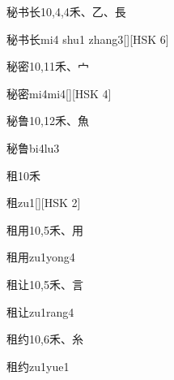 \begin{Entry}{秘书长}{10,4,4}{⽲、⼄、⾧}
  \begin{Phonetics}{秘书长}{mi4 shu1 zhang3}[][HSK 6]
  \end{Phonetics}
\end{Entry}

\begin{Entry}{秘密}{10,11}{⽲、⼧}
  \begin{Phonetics}{秘密}{mi4mi4}[][HSK 4]
  \end{Phonetics}
\end{Entry}

\begin{Entry}{秘鲁}{10,12}{⽲、⿂}
  \begin{Phonetics}{秘鲁}{bi4lu3}
  \end{Phonetics}
\end{Entry}

\begin{Entry}{租}{10}{⽲}
  \begin{Phonetics}{租}{zu1}[][HSK 2]
  \end{Phonetics}
\end{Entry}

\begin{Entry}{租用}{10,5}{⽲、⽤}
  \begin{Phonetics}{租用}{zu1yong4}
  \end{Phonetics}
\end{Entry}

\begin{Entry}{租让}{10,5}{⽲、⾔}
  \begin{Phonetics}{租让}{zu1rang4}
  \end{Phonetics}
\end{Entry}

\begin{Entry}{租约}{10,6}{⽲、⽷}
  \begin{Phonetics}{租约}{zu1yue1}
  \end{Phonetics}
\end{Entry}

